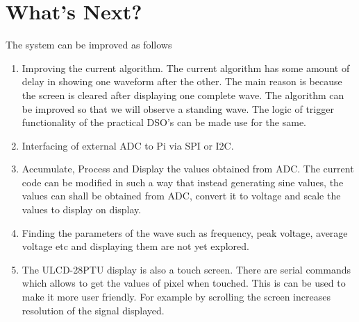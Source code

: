 \documentclass[12pt, a4paper, twoside]{article}
\begin{document}
\section{What's Next?}
	The system can be improved as follows
\begin{enumerate}
	\item Improving the current algorithm. The current algorithm has some amount of delay in showing one waveform after the other. The main reason is because the screen is cleared after displaying one complete wave. The algorithm can be improved so that we will observe a standing wave. The logic of trigger functionality of the practical DSO's can be made use for the same. 
	\item Interfacing of external ADC to Pi via SPI or I2C.
	\item Accumulate, Process and Display the values obtained from ADC. The current code can be modified in such a way that instead generating sine values, the values can shall be obtained from ADC, convert it to voltage and scale the values to display on display.
	\item Finding the parameters of the wave such as frequency, peak voltage, average voltage etc and displaying them are not yet explored. 
	\item The ULCD-28PTU display is also a touch screen. There are serial commands which allows to get the values of pixel when touched. This is can be used to make it more user friendly. For example by scrolling the screen increases resolution of the signal displayed.
\end{enumerate}



 
\end{document}
